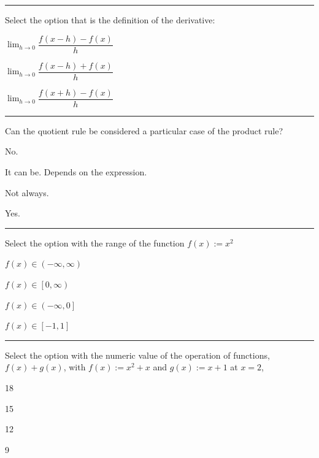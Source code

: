 \begin{preguntas}

\pregunta[5] \rule{1cm}{0.1mm} Select the option that is the definition of the derivative:

\begin{enumerate*}[label=(\alph*)]
    \item \(\lim_{h\to0}\dfrac{f(x-h)-f(x)}{h}\quad\)
    \item \(\lim_{h\to0}\dfrac{f(x-h)+f(x)}{h}\quad\)
    \item \(\lim_{h\to0}\dfrac{f(x+h)-f(x)}{h}\)
\end{enumerate*}

\pregunta[5] \rule{1cm}{0.1mm} Can the quotient rule be considered a particular case of the product rule? 

\begin{enumerate*}[label=(\alph*)]
    \item No. \hspace{2em} 
    \item It can be. Depends on the expression. \hspace{2em}
    \item Not always.\hspace{2em}
    \item Yes. 
\end{enumerate*}

\pregunta[5] \rule{1cm}{0.1mm} Select the option with the range of the function $f(x):=x^2$

\begin{enumerate*}[label=(\alph*)]
    \item $f(x)\in\left(-\infty,\infty\right)\qquad$
    \item $f(x)\in\left[0,\infty\right)\qquad$
    \item $f(x)\in\left(-\infty,0\right]\qquad$
    \item $f(x)\in\left[-1,1\right]\qquad$
\end{enumerate*}

\pregunta[5] \rule{1cm}{0.1mm} Select the option with the numeric value of the operation of functions, $f(x) + g(x)$, with $f(x):= x^2 + x$ and $g(x):=x+1$ at $x=2$,

\begin{enumerate*}[label=(\alph*)]
    \item 18 $\qquad$
    \item 15 $\qquad$
    \item 12 $\qquad$
    \item 9 $\qquad$
\end{enumerate*}


\end{preguntas}
